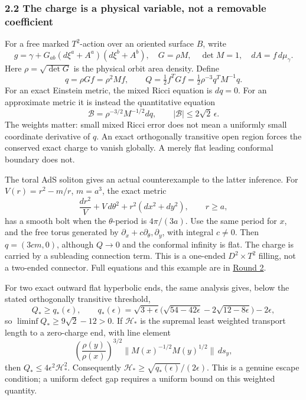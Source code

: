 \documentclass[
  english,
]{article}
\begin{document}
\hypertarget{the-charge-is-a-physical-variable-not-a-removable-coefficient}{%
\subsubsection{2.2 The charge is a physical variable, not a removable
coefficient}\label{the-charge-is-a-physical-variable-not-a-removable-coefficient}}

For a free marked \(T^2\)-action over an oriented surface \(B\), write
\[
 g=\gamma+G_{ab}(d\xi^a+A^a)(d\xi^b+A^b),\quad
 G=\rho M,\quad \det M=1,\quad dA=f\,d\mu_\gamma.
\] Here \(\rho=\sqrt{\det G}\) is the physical orbit area density.
Define \[
 q=\rho Gf=\rho^2Mf,\qquad
 Q=\tfrac12 f^TGf=\tfrac12\rho^{-3}q^TM^{-1}q.
\] For an exact Einstein metric, the mixed Ricci equation is \(dq=0\).
For an approximate metric it is instead the quantitative equation \[
 \mathscr B=\rho^{-3/2}M^{-1/2}dq,\qquad
 |\mathscr B|\le2\sqrt2\,\epsilon.
\] The weights matter: small mixed Ricci error does not mean a uniformly
small coordinate derivative of \(q\). An exact orthogonally transitive
open region forces the conserved exact charge to vanish globally. A
merely flat leading conformal boundary does not.

The toral AdS soliton gives an actual counterexample to the latter
inference. For \(V(r)=r^2-m/r\), \(m=a^3\), the exact metric \[
 \frac{dr^2}{V}+V\,d\theta^2+r^2(dx^2+dy^2),\qquad r\ge a,
\] has a smooth bolt when the \(\theta\)-period is \(4\pi/(3a)\). Use
the same period for \(x\), and the free torus generated by
\(\partial_x+c\partial_\theta,\partial_y\), with integral \(c\ne0\).
Then \(q=(3cm,0)\), although \(Q\to0\) and the conformal infinity is
flat. The charge is carried by a subleading connection term. This is a
one-ended \(D^2\times T^2\) filling, not a two-ended connector. Full
equations and this example are in
\href{../proofs/round2_global.md}{Round 2}.

For two exact outward flat hyperbolic ends, the same analysis gives,
below the stated orthogonally transitive threshold, \[
 Q_*\ge q_*(\epsilon),\qquad
 q_*(\epsilon)=\sqrt{3+\epsilon}
   \bigl(\sqrt{54-42\epsilon}-2\sqrt{12-8\epsilon}\bigr)-2\epsilon,
\] so \(\liminf Q_*\ge9\sqrt2-12>0\). If \(\mathcal H_*\) is the
supremal least weighted transport length to a zero-charge end, with line
element \[
 \left(\frac{\rho(y)}{\rho(x)}\right)^{3/2}
 \|M(x)^{-1/2}M(y)^{1/2}\|\,ds_y,
\] then \(Q_*\le4\epsilon^2\mathcal H_*^2\). Consequently
\(\mathcal H_*\ge\sqrt{q_*(\epsilon)}/(2\epsilon)\). This is a genuine
escape condition; a uniform defect gap requires a uniform bound on this
weighted quantity.
\end{document}
